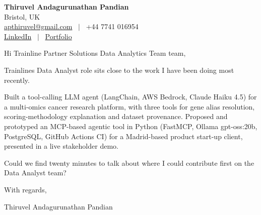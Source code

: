 \documentclass[11pt,a4paper]{article}
\begin{document}
\raggedright
\pagestyle{empty}

\begin{center}
    {\LARGE \color{linkblue} \textbf{Thiruvel Andagurunathan Pandian}}\\[0.2cm]
    Bristol, UK \\
    \href{mailto:apthiruvel@gmail.com}{apthiruvel@gmail.com} \ $|$ \ +44 7741 016954 \\
\href{https://www.linkedin.com/in/thiruvel-a-p/}{LinkedIn} \ $|$ \ \href{https://thiruvel-ap.github.io/PersonalPortfolio/}{Portfolio}
\end{center}

\vspace{0.4cm}

\noindent
Hi Trainline Partner Solutions Data Analytics Team team,

Trainline\textquotesingle{}s Data Analyst role sits close to the work I have been doing most recently.

Built a tool-calling LLM agent (LangChain, AWS Bedrock, Claude Haiku 4.5) for a multi-omics cancer research platform, with three tools for gene alias resolution, scoring-methodology explanation and dataset provenance. Proposed and prototyped an MCP-based agentic tool in Python (FastMCP, Ollama gpt-oss:20b, PostgreSQL, GitHub Actions CI) for a Madrid-based product start-up client, presented in a live stakeholder demo.

Could we find twenty minutes to talk about where I could contribute first on the Data Analyst team?

\vspace{0.5cm}

With regards,

Thiruvel Andagurunathan Pandian
\end{document}
